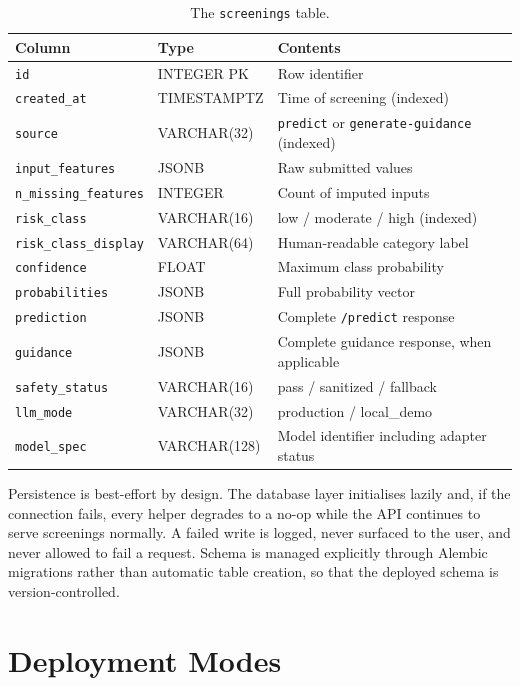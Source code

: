 \begin{table}[H]
\centering
\caption{The \texttt{screenings} table.}
\label{tab:dbschema}
\small
\begin{tabularx}{\textwidth}{@{}L{1.55in} L{1.15in} X@{}}
\toprule
\textbf{Column} & \textbf{Type} & \textbf{Contents} \\
\midrule
\texttt{id} & INTEGER PK & Row identifier \\
\texttt{created\_at} & TIMESTAMPTZ & Time of screening (indexed) \\
\texttt{source} & VARCHAR(32) & \texttt{predict} or \texttt{generate-guidance} (indexed) \\
\texttt{input\_features} & JSONB & Raw submitted values \\
\texttt{n\_missing\_features} & INTEGER & Count of imputed inputs \\
\texttt{risk\_class} & VARCHAR(16) & low / moderate / high (indexed) \\
\texttt{risk\_class\_display} & VARCHAR(64) & Human-readable category label \\
\texttt{confidence} & FLOAT & Maximum class probability \\
\texttt{probabilities} & JSONB & Full probability vector \\
\texttt{prediction} & JSONB & Complete \texttt{/predict} response \\
\texttt{guidance} & JSONB & Complete guidance response, when applicable \\
\texttt{safety\_status} & VARCHAR(16) & pass / sanitized / fallback \\
\texttt{llm\_mode} & VARCHAR(32) & production / local\_demo \\
\texttt{model\_spec} & VARCHAR(128) & Model identifier including adapter status \\
\bottomrule
\end{tabularx}
\end{table}

Persistence is best-effort by design. The database layer initialises lazily and,
if the connection fails, every helper degrades to a no-op while the API
continues to serve screenings normally. A failed write is logged, never
surfaced to the user, and never allowed to fail a request. Schema is managed
explicitly through Alembic migrations rather than automatic table creation, so
that the deployed schema is version-controlled.

\section{Deployment Modes}
\label{sec:modes}

